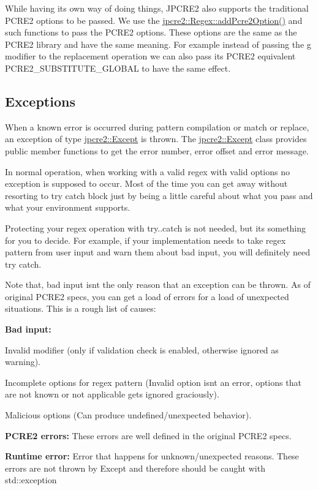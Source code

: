 While having its own way of doing things, J\+P\+C\+R\+E2 also supports the traditional P\+C\+R\+E2 options to be passed. We use the {\ttfamily \hyperlink{classjpcre2_1_1Regex_a2c7dcf12f26b2b046e147b013c8b5087_a2c7dcf12f26b2b046e147b013c8b5087}{jpcre2\+::\+Regex\+::add\+Pcre2\+Option()}} and such functions to pass the P\+C\+R\+E2 options. These options are the same as the P\+C\+R\+E2 library and have the same meaning. For example instead of passing the \textquotesingle{}g\textquotesingle{} modifier to the replacement operation we can also pass its P\+C\+R\+E2 equivalent {\ttfamily P\+C\+R\+E2\+\_\+\+S\+U\+B\+S\+T\+I\+T\+U\+T\+E\+\_\+\+G\+L\+O\+B\+AL} to have the same effect.\hypertarget{index_exceptions}{}\subsection{Exceptions}\label{index_exceptions}
When a known error is occurred during pattern compilation or match or replace, an exception of type {\ttfamily \hyperlink{classjpcre2_1_1Except}{jpcre2\+::\+Except}} is thrown. The {\ttfamily \hyperlink{classjpcre2_1_1Except}{jpcre2\+::\+Except}} class provides public member functions to get the error number, error offset and error message.

In normal operation, when working with a valid regex with valid options no exception is supposed to occur. Most of the time you can get away without resorting to try catch block just by being a little careful about what you pass and what your environment supports.

Protecting your regex operation with try..catch is not needed, but it\textquotesingle{}s something for you to decide. For example, if your implementation needs to take regex pattern from user input and warn them about bad input, you will definitely need try catch.

Note that, bad input isn\textquotesingle{}t the only reason that an exception can be thrown. As of original P\+C\+R\+E2 specs, you can get a load of errors for a load of unexpected situations. This is a rough list of causes\+:


\begin{DoxyEnumerate}
\item {\bfseries Bad input\+:}
\begin{DoxyEnumerate}
\item Invalid modifier (only if validation check is enabled, otherwise ignored as warning).
\item Incomplete options for regex pattern (Invalid option isn\textquotesingle{}t an error, options that are not known or not applicable gets ignored graciously).
\item Malicious options (Can produce undefined/unexpected behavior).
\end{DoxyEnumerate}
\item {\bfseries P\+C\+R\+E2 errors\+:} These errors are well defined in the original P\+C\+R\+E2 specs.
\item {\bfseries Runtime error\+:} Error that happens for unknown/unexpected reasons. These errors are not thrown by Except and therefore should be caught with {\ttfamily std\+::exception}
\end{DoxyEnumerate}

